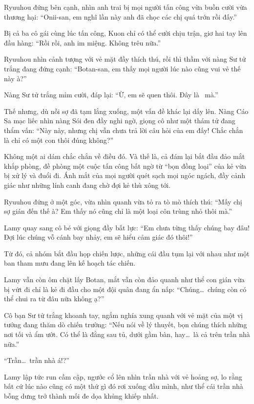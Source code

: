 \documentclass[../main.tex]{subfiles}
\begin{document}
Ryuuhou đứng bên cạnh, nhìn anh trai bị mọi người tấn công vừa buồn cười vừa thương hại: ``Onii-san, em nghĩ lần này anh đã chọc các chị quá trớn rồi đấy.''

Bị cả ba cô gái cùng lúc tấn công, Kuon chỉ có thể cười chịu trận, giơ hai tay lên đầu hàng: ``Rồi rồi, anh im miệng. Không trêu nữa.''

Ryuuhou nhìn cảnh tượng với vẻ mặt đầy thích thú, rồi thì thầm với nàng Sư tử trắng đang đứng cạnh: ``Botan-san, em thấy mọi người lúc nào cũng vui vẻ thế này à?''

Nàng Sư tử trắng mỉm cười, đáp lại: ``Ừ, em sẽ quen thôi. Đây là \hll\ mà.''

Thế nhưng, dù nỗi sợ đã tạm lắng xuống, một vấn đề khác lại dấy lên. Nàng Cáo Sa mạc liếc nhìn nàng Sói đen đầy nghi ngờ, giọng cô như một thám tử đang thẩm vấn: ``Này này, nhưng chị vẫn chưa trả lời câu hỏi của em đấy! Chắc chắn là chỉ có một con thôi đúng không?''

Không một ai dám chắc chắn về điều đó. Và thế là, cả đám lại bắt đầu đảo mắt khắp phòng, đề phòng một cuộc tấn công bất ngờ từ ``bọn đồng loại'' của kẻ vừa bị xử lý và đuổi đi. Ánh mắt của mọi người quét sạch mọi ngóc ngách, đầy cảnh giác như những lính canh đang chờ đợi kẻ thù xông tới.

Ryuuhou đứng ở một góc, vừa nhìn quanh vừa tỏ ra tò mò thích thú: ``Mấy chị sợ gián đến thế à? Em thấy nó cũng chỉ là một loại côn trùng nhỏ thôi mà.''

Lamy quay sang cô bé với giọng đầy bất lực: ``Em chưa từng thấy chúng bay đâu! Đợi lúc chúng vỗ cánh bay nhảy, em sẽ hiểu cảm giác đó thôi!''

Từ đó, cả nhóm bắt đầu họp chiến lược, những cái đầu tụm lại với nhau như một ban tham mưu đang lên kế hoạch tác chiến.

Lamy vẫn còn ôm chặt lấy Botan, mắt vẫn còn đảo quanh như thể con gián vừa bị vứt đi chỉ là kẻ đi đầu cho một đội quân đang ẩn nấp: ``Chúng\dots\ chúng còn có thể chui ra từ đâu nữa không ạ?''

Cô bạn Sư tử trắng khoanh tay, ngắm nghía xung quanh với vẻ mặt của một vị tướng đang thăm dò chiến trường: ``Nếu nói về lý thuyết, bọn chúng thích những nơi tối và ẩm ướt. Có thể là đằng sau tủ, dưới gầm bàn, hay\dots\ là cả trên trần nhà nữa.''

``Trần\dots\ trần nhà á!?''

Lamy lập tức run cầm cập, ngước cổ lên nhìn trần nhà với vẻ hoảng sợ, lo rằng bất cứ lúc nào cũng có một thứ gì đó rơi xuống đầu mình, như thể cái trần nhà bỗng dưng trở thành mối đe dọa khủng khiếp nhất.
\end{document}
